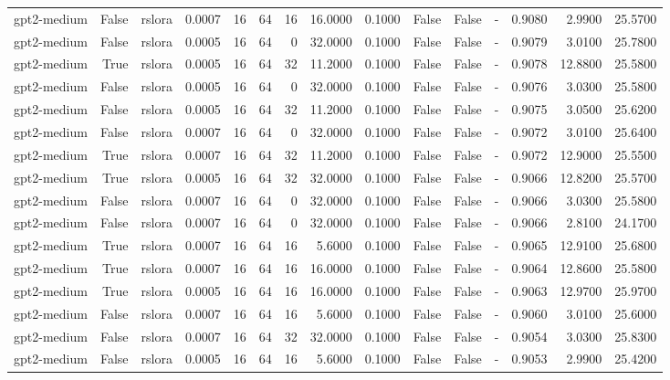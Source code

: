 \begin{tabular}{lrlrrrrrrlllrrr}
gpt2-medium & False & rslora & 0.0007 & 16 & 64 & 16 & 16.0000 & 0.1000 & False & False & - & 0.9080 & 2.9900 & 25.5700 \\
gpt2-medium & False & rslora & 0.0005 & 16 & 64 & 0 & 32.0000 & 0.1000 & False & False & - & 0.9079 & 3.0100 & 25.7800 \\
gpt2-medium & True & rslora & 0.0005 & 16 & 64 & 32 & 11.2000 & 0.1000 & False & False & - & 0.9078 & 12.8800 & 25.5800 \\
gpt2-medium & False & rslora & 0.0005 & 16 & 64 & 0 & 32.0000 & 0.1000 & False & False & - & 0.9076 & 3.0300 & 25.5800 \\
gpt2-medium & False & rslora & 0.0005 & 16 & 64 & 32 & 11.2000 & 0.1000 & False & False & - & 0.9075 & 3.0500 & 25.6200 \\
gpt2-medium & False & rslora & 0.0007 & 16 & 64 & 0 & 32.0000 & 0.1000 & False & False & - & 0.9072 & 3.0100 & 25.6400 \\
gpt2-medium & True & rslora & 0.0007 & 16 & 64 & 32 & 11.2000 & 0.1000 & False & False & - & 0.9072 & 12.9000 & 25.5500 \\
gpt2-medium & True & rslora & 0.0005 & 16 & 64 & 32 & 32.0000 & 0.1000 & False & False & - & 0.9066 & 12.8200 & 25.5700 \\
gpt2-medium & False & rslora & 0.0007 & 16 & 64 & 0 & 32.0000 & 0.1000 & False & False & - & 0.9066 & 3.0300 & 25.5800 \\
gpt2-medium & False & rslora & 0.0007 & 16 & 64 & 0 & 32.0000 & 0.1000 & False & False & - & 0.9066 & 2.8100 & 24.1700 \\
gpt2-medium & True & rslora & 0.0007 & 16 & 64 & 16 & 5.6000 & 0.1000 & False & False & - & 0.9065 & 12.9100 & 25.6800 \\
gpt2-medium & True & rslora & 0.0007 & 16 & 64 & 16 & 16.0000 & 0.1000 & False & False & - & 0.9064 & 12.8600 & 25.5800 \\
gpt2-medium & True & rslora & 0.0005 & 16 & 64 & 16 & 16.0000 & 0.1000 & False & False & - & 0.9063 & 12.9700 & 25.9700 \\
gpt2-medium & False & rslora & 0.0007 & 16 & 64 & 16 & 5.6000 & 0.1000 & False & False & - & 0.9060 & 3.0100 & 25.6000 \\
gpt2-medium & False & rslora & 0.0007 & 16 & 64 & 32 & 32.0000 & 0.1000 & False & False & - & 0.9054 & 3.0300 & 25.8300 \\
gpt2-medium & False & rslora & 0.0005 & 16 & 64 & 16 & 5.6000 & 0.1000 & False & False & - & 0.9053 & 2.9900 & 25.4200 \\

\end{tabular}
